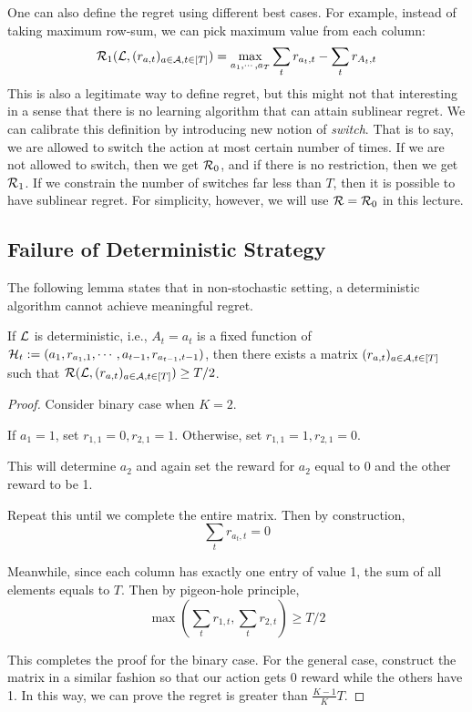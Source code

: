 \documentclass[11pt]{article}
\begin{document}
One can also define the regret using different best cases. For example, instead of taking maximum row-sum, we can pick maximum value from each column:
$$
\mathcal{R}_1(\mathcal{L}, (r_{a, t})_{a\in\mathcal{A}, t \in [T]}) = \max_{a_1, \cdots , a_T} \sum_t r_{a_t, t} - \sum_t r_{A_t, t}
$$
This is also a legitimate way to define regret, but this might not that interesting in a sense that there is no learning algorithm that can attain sublinear regret. We can calibrate this definition by introducing new notion of \textit{switch}. That is to say, we are allowed to switch the action at most certain number of times. If we are not allowed to switch, then we get $\mathcal{R}_0$, and if there is no restriction, then we get $\mathcal{R}_1$. If we constrain the number of switches far less than $T$, then it is possible to have sublinear regret. For simplicity, however, we will use $\mathcal{R} = \mathcal{R}_0$ in this lecture. 

\subsection{Failure of Deterministic Strategy}
The following lemma states that in non-stochastic setting, a deterministic algorithm cannot achieve meaningful regret. 
\begin{lemma}
If $\mathcal{L}$ is deterministic, i.e., $A_t = a_t$ is a fixed function of $\mathcal{H}_t := (a_1, r_{a_1, 1}, \cdots, a_{t-1}, r_{a_{t-1}, t-1})$, then there exists a matrix $(r_{a, t})_{a\in\mathcal{A}, t \in [T]}$ such that $\mathcal{R}(\mathcal{L}, (r_{a, t})_{a\in\mathcal{A}, t \in [T]}) \geq T/2$. 
\end{lemma}

\begin{proof}
Consider binary case when $K=2$. 

If $a_1=1$, set $r_{1, 1}=0, r_{2, 1}=1$. Otherwise, set $r_{1, 1}=1, r_{2, 1}=0$. 

This will determine $a_2$ and again set the reward for $a_2$ equal to 0 and the other reward to be 1. 

Repeat this until we complete the entire matrix. Then by construction, 
$$
\sum_t r_{a_t, t} = 0
$$

Meanwhile, since each column has exactly one entry of value 1, the sum of all elements equals to $T$. Then by pigeon-hole principle, 
$$
\max(\sum_t r_{1, t}, \sum_t r_{2, t})\geq T/2
$$

This completes the proof for the binary case. For the general case, construct the matrix in a similar fashion so that our action gets 0 reward while the others have 1. In this way, we can prove the regret is greater than $\frac{K-1}{K}T$.
\end{proof}
\end{document}
